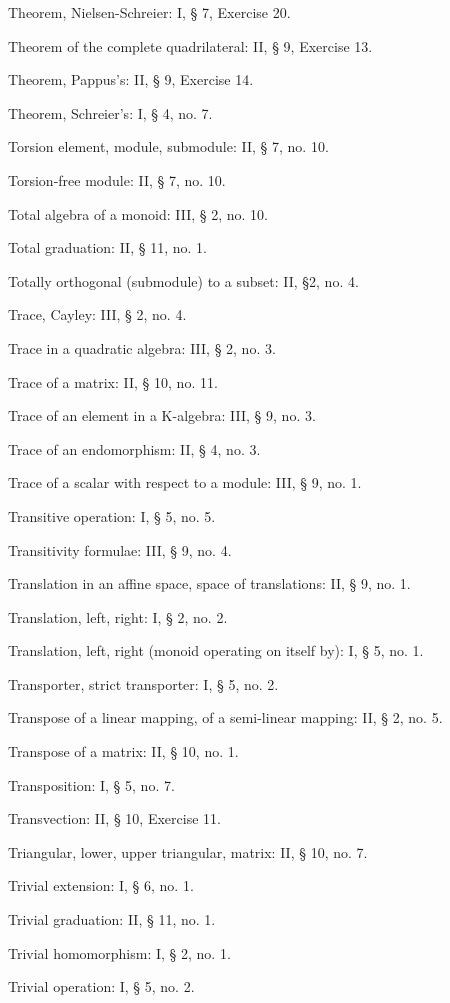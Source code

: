 Theorem, Nielsen-Schreier: I, § 7, Exercise 20.

Theorem of the complete quadrilateral: II, § 9, Exercise 13.

Theorem, Pappus's: II, § 9, Exercise 14.

Theorem, Schreier's: I, § 4, no. 7.

Torsion element, module, submodule: II, § 7, no. 10.

Torsion-free module: II, § 7, no. 10.

Total algebra of a monoid: III, § 2, no. 10.

Total graduation: II, § 11, no. 1.

Totally orthogonal (submodule) to a subset: II, §2, no. 4.

Trace, Cayley: III, § 2, no. 4.

Trace in a quadratic algebra: III, § 2, no. 3.

Trace of a matrix: II, § 10, no. 11.

Trace of an element in a K-algebra: III, § 9, no. 3.

Trace of an endomorphism: II, § 4, no. 3.

Trace of a scalar with respect to a module: III, § 9, no. 1.

Transitive operation: I, § 5, no. 5.

Transitivity formulae: III, § 9, no. 4.

Translation in an affine space, space of translations: II, § 9, no. 1.

Translation, left, right: I, § 2, no. 2.

Translation, left, right (monoid operating on itself by): I, § 5, no. 1.

Transporter, strict transporter: I, § 5, no. 2.

Transpose of a linear mapping, of a semi-linear mapping: II, § 2, no. 5.

Transpose of a matrix: II, § 10, no. 1.

Transposition: I, § 5, no. 7.

Transvection: II, § 10, Exercise 11.

Triangular, lower, upper triangular, matrix: II, § 10, no. 7.

Trivial extension: I, § 6, no. 1.

Trivial graduation: II, § 11, no. 1.

Trivial homomorphism: I, § 2, no. 1.

Trivial operation: I, § 5, no. 2.

